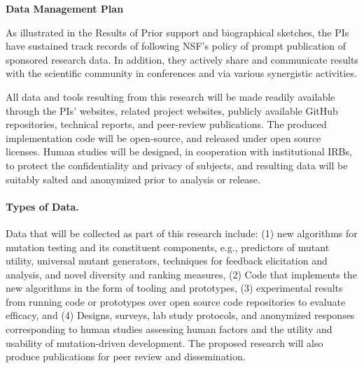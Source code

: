 \documentclass[11pt]{article}
\begin{document}
\begin{center}
{\Large\sf\textbf{Data Management Plan }} 
\end{center}


As illustrated in the Results of Prior support and biographical sketches, the
PIs have sustained track records of following NSF's policy of prompt publication
of sponsored research data.  In addition, they actively share and communicate
results with the scientific community in conferences and via various synergistic
activities.

All data and tools resulting from this research will be made readily available
through the PIs' websites, related project websites, publicly available GitHub
repositories, technical reports, and peer-review publications.  The produced
implementation code will be open-source, and released under open source
licenses.  Human studies will be designed, in cooperation with institutional
IRBs, to protect the confidentiality and privacy of subjects, and resulting data
will be suitably salted and anonymized prior to analysis or release.


\paragraph{Types of Data.} Data that will be collected as part of this research
include: (1) new algorithms for mutation testing and its constituent components,
e.g., predictors of mutant utility, universal mutant generators, techniques for
feedback elicitation and analysis, and novel diversity and ranking measures, (2)
Code that implements the new algorithms in the form of tooling and prototypes,
(3) experimental results from running code or prototypes over open source code
repositories to evaluate efficacy, and (4) Designs, surveys, lab study
protocols, and anonymized responses corresponding to human studies assessing
human factors and the utility and usability of mutation-driven development.  The
proposed research will also produce publications for peer review and
dissemination.
\end{document}
